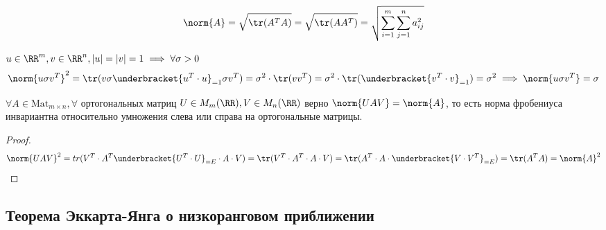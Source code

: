 \begin{equation*}
    \norm{A} = \sqrt{\tr (A^T A)} = \sqrt{\tr (A A^T)} = \sqrt{\sum_{i=1}^m \sum_{j=1}^n a_{i j}^2}
\end{equation*}

\begin{example}
    $u \in \RR^m, v \in \RR^n, |u| = |v| = 1 \implies \forall \sigma > 0$
    \begin{equation*}
        \norm{u \sigma v^T}^2 = \tr (v \sigma \underbracket{u^T \cdot u}_{=1} \sigma v^T ) = \sigma^2 \cdot \tr (v v^T) = \sigma^2 \cdot \tr (\underbracket{v^T \cdot v}_{=1}) = \sigma^2 \implies \norm{u \sigma v^T} = \sigma
    \end{equation*}
\end{example}

\begin{proposal}
    $\forall A \in \text{Mat}_{m \times n}, \forall$ ортогональных матриц $U \in M_m (\RR), V \in M_n (\RR)$ верно $\norm{U A V} = \norm{A}$, то есть норма фробениуса инвариантна относительно умножения слева или справа на ортогональные матрицы.
\end{proposal}

\begin{proof}
    \begin{equation*}
        \norm{U A V}^2 = tr(V^T \cdot A^T \underbracket{U^T \cdot U}_{=E} \cdot A \cdot V) = \tr (V^T \cdot A^T \cdot A \cdot V) = \tr (A^T \cdot A \cdot \underbracket{V \cdot V^T}_{=E}) = \tr (A^T A) = \norm{A}^2
    \end{equation*}
\end{proof}

\subsection{Теорема Эккарта-Янга о низкоранговом приближении}

